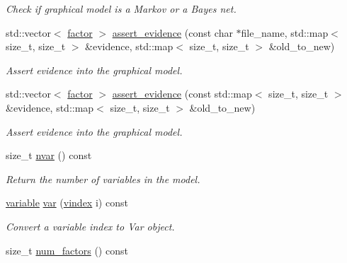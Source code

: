 \begin{DoxyCompactItemize}
\begin{DoxyCompactList}\small\item\em Check if graphical model is a Markov or a Bayes net. \end{DoxyCompactList}\item 
std\+::vector$<$ \hyperlink{classmerlin_1_1factor}{factor} $>$ \hyperlink{classmerlin_1_1graphical__model_a6edc6fc8040434b62ab2761805b02525}{assert\+\_\+evidence} (const char $\ast$file\+\_\+name, std\+::map$<$ size\+\_\+t, size\+\_\+t $>$ \&evidence, std\+::map$<$ size\+\_\+t, size\+\_\+t $>$ \&old\+\_\+to\+\_\+new)
\begin{DoxyCompactList}\small\item\em Assert evidence into the graphical model. \end{DoxyCompactList}\item 
std\+::vector$<$ \hyperlink{classmerlin_1_1factor}{factor} $>$ \hyperlink{classmerlin_1_1graphical__model_aa06bf7612a9c5827509504e85760df6e}{assert\+\_\+evidence} (const std\+::map$<$ size\+\_\+t, size\+\_\+t $>$ \&evidence, std\+::map$<$ size\+\_\+t, size\+\_\+t $>$ \&old\+\_\+to\+\_\+new)
\begin{DoxyCompactList}\small\item\em Assert evidence into the graphical model. \end{DoxyCompactList}\item 
size\+\_\+t \hyperlink{classmerlin_1_1graphical__model_af70ee4f7a4414fac4f7568e3c0e5efca}{nvar} () const \hypertarget{classmerlin_1_1graphical__model_af70ee4f7a4414fac4f7568e3c0e5efca}{}\label{classmerlin_1_1graphical__model_af70ee4f7a4414fac4f7568e3c0e5efca}

\begin{DoxyCompactList}\small\item\em Return the number of variables in the model. \end{DoxyCompactList}\item 
\hyperlink{classmerlin_1_1variable}{variable} \hyperlink{classmerlin_1_1graphical__model_a879e8c3766482cc36e96372531e5daef}{var} (\hyperlink{classmerlin_1_1graphical__model_a275006a490bc09239c12a4d93d53b135}{vindex} i) const 
\begin{DoxyCompactList}\small\item\em Convert a variable index to Var object. \end{DoxyCompactList}\item 
size\+\_\+t \hyperlink{classmerlin_1_1graphical__model_ad9cb2599d03e1c60a9201272f461fa5d}{num\+\_\+factors} () const \hypertarget{classmerlin_1_1graphical__model_ad9cb2599d03e1c60a9201272f461fa5d}{}\label{classmerlin_1_1graphical__model_ad9cb2599d03e1c60a9201272f461fa5d}


\end{DoxyCompactItemize}

